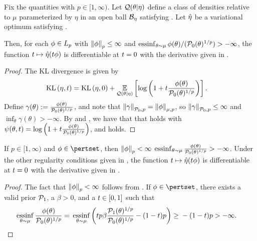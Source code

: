 \begin{thm}
%
Fix the quantities  with $p \in [1, \infty)$.
Let $\mathcal{Q}(\theta \vert \eta)$ define a class of densities relative to $\mu$
parameterized by $\eta$ in an open ball $\mathcal{B}_\eta$ satisfying
.  Let $\hat\eta$ be a variational optimum satisfying
.

Then, for each $\phi \in {L_{p}}$ with $\left\Vert\phi\right\Vert_p \le \infty$ and
$\operatorname*{\mathrm{essinf}}_{\theta\sim\mu} \phi(\theta) / (\mathcal{P}_{0}(\theta)^{1/p})> -\infty$, the
function $t \mapsto \hat\eta(t \phi)$ is differentiable at $t = 0$ with the
derivative given in .
%
\begin{proof}
%
The KL divergence is given by
%
\begin{align*}
%
\KL{\eta, \t} ={}&
    \KL{\eta, 0} +
    \expect{\q(\theta \vert \eta)}
           {\log \left(1 + \t \frac{\phi(\theta)}{\pbase(\theta)^{1/p}} \right)}.
%
\end{align*}
%
Define $\gamma(\theta) := \frac{\phi(\theta)}{\mathcal{P}_{0}(\theta)^{1/p}}$, and note
that $\left\Vert\gamma\right\Vert_{\mathcal{P}_{0}, p} = \left\Vert\phi\right\Vert_{\mu,p}$, so
$\left\Vert\gamma\right\Vert_{\mathcal{P}_{0}, p} \le \infty$ and $\inf_\theta \gamma(\theta) >
-\infty$.  By  and , we have
that that  holds with $\psi(\theta, t) = \log \left(1 +
t \frac{\phi(\theta)}{\mathcal{P}_{0}(\theta)^{1/p}}\right)$, and 
holds.
%
\end{proof}
%
\end{thm}


\begin{cor}
%
If $p \in [1, \infty)$ and  $\phi \in \pertset$, then $\left\Vert\phi\right\Vert_p < \infty$
$\operatorname*{\mathrm{essinf}}_{\theta \sim \mu}\frac{\phi(\theta)}{\mathcal{P}_{0}(\theta)^{1/p}} > -\infty$.
Under the other regularity conditions given in , the
function $t \mapsto \hat\eta(t \phi)$ is differentiable at $t = 0$ with the
derivative given in .
%
\begin{proof}
%
The fact that $\left\Vert\phi\right\Vert_p < \infty$ follows from .
If $\phi \in \pertset$, there exists a valid prior $\mathcal{P}_{1}$, a $\beta > 0$,
and a $t \in [0,1]$ such that
%
\begin{align*}
%
\essinf_{\theta \sim \mu}  \frac{\phi(\theta)}{\pbase(\theta)^{1/p}}
 ={}&
 \essinf_{\theta \sim \mu} \left(
    \t p\beta \frac{\palt(\theta)^{1/p}}{\pbase(\theta)^{1/p}} - (1-\t) p
    \right)
    \ge{} - (1-\t) p > -\infty.
%
\end{align*}
%
\end{proof}
%
\end{cor}

